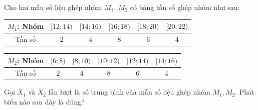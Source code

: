 \begin{ex}
Cho hai mẫu số liệu ghép nhóm $M_1$, $M_2$ có bảng tần số ghép nhóm như sau:
\begin{center}
\renewcommand{\arraystretch}{1.2}
\begin{tabular}{|c|c|c|c|c|c|}
\hline
$M_1$: Nhóm & $[12;14)$ & $[14;16)$ & $[16;18)$ & $[18;20)$ & $[20;22)$ \\
\hline
Tần số & $2$ & $4$ & $8$ & $6$ & $4$ \\
\hline
\end{tabular}

\medskip
\begin{tabular}{|c|c|c|c|c|c|}
\hline
$M_2$: Nhóm & $[6;8)$ & $[8;10)$ & $[10;12)$ & $[12;14)$ & $[14;16)$ \\
\hline
Tần số & $2$ & $4$ & $8$ & $6$ & $4$ \\
\hline
\end{tabular}
\end{center}
Gọi $\overline{X}_1$ và $\overline{X}_2$ lần lượt là số trung bình của mẫu số liệu ghép nhóm $M_1,M_2$. Phát biểu nào sau đây là đúng?
\end{ex}
